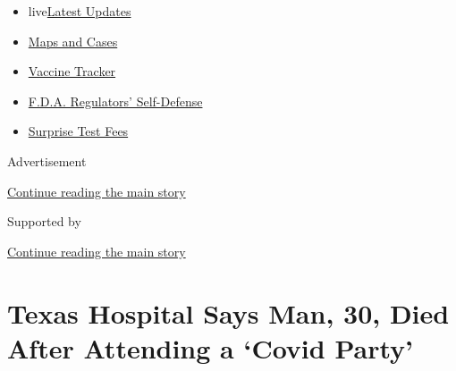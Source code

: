 \begin{itemize}
\tightlist
\item
  live\href{https://www.nytimes3xbfgragh.onion/2020/09/12/world/covid-19-coronavirus.html?name=styln-coronavirus-national\&region=TOP_BANNER\&block=storyline_menu_recirc\&action=click\&pgtype=Article\&impression_id=b1e81860-f52e-11ea-bf53-6d1183b5f58a\&variant=undefined}{Latest
  Updates}
\item
  \href{https://www.nytimes3xbfgragh.onion/interactive/2020/us/coronavirus-us-cases.html?name=styln-coronavirus-national\&region=TOP_BANNER\&block=storyline_menu_recirc\&action=click\&pgtype=Article\&impression_id=b1e81861-f52e-11ea-bf53-6d1183b5f58a\&variant=undefined}{Maps
  and Cases}
\item
  \href{https://www.nytimes3xbfgragh.onion/interactive/2020/science/coronavirus-vaccine-tracker.html?name=styln-coronavirus-national\&region=TOP_BANNER\&block=storyline_menu_recirc\&action=click\&pgtype=Article\&impression_id=b1e81862-f52e-11ea-bf53-6d1183b5f58a\&variant=undefined}{Vaccine
  Tracker}
\item
  \href{https://www.nytimes3xbfgragh.onion/2020/09/10/us/politics/fda-coronavirus-vaccine.html?name=styln-coronavirus-national\&region=TOP_BANNER\&block=storyline_menu_recirc\&action=click\&pgtype=Article\&impression_id=b1e81863-f52e-11ea-bf53-6d1183b5f58a\&variant=undefined}{F.D.A.
  Regulators' Self-Defense}
\item
  \href{https://www.nytimes3xbfgragh.onion/2020/09/09/upshot/coronavirus-surprise-test-fees.html?name=styln-coronavirus-national\&region=TOP_BANNER\&block=storyline_menu_recirc\&action=click\&pgtype=Article\&impression_id=b1e81864-f52e-11ea-bf53-6d1183b5f58a\&variant=undefined}{Surprise
  Test Fees}
\end{itemize}

Advertisement

\protect\hyperlink{after-top}{Continue reading the main story}

Supported by

\protect\hyperlink{after-sponsor}{Continue reading the main story}

\hypertarget{texas-hospital-says-man-30-died-after-attending-a-covid-party}{%
\section{Texas Hospital Says Man, 30, Died After Attending a `Covid
Party'}\label{texas-hospital-says-man-30-died-after-attending-a-covid-party}}

